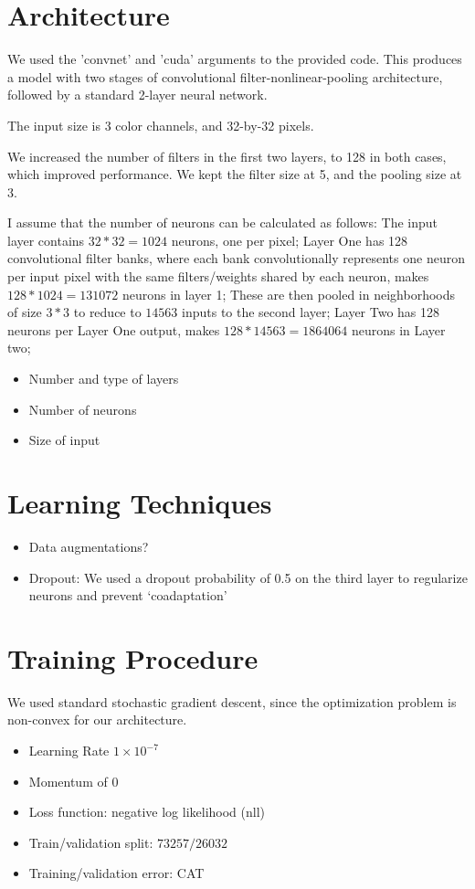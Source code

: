 \documentclass{article}
\begin{document}
\section{Architecture}

We used the 'convnet' and 'cuda' arguments to the provided code. This produces a model with two stages of convolutional filter-nonlinear-pooling architecture, followed by a standard 2-layer neural network.

The input size is 3 color channels, and 32-by-32 pixels.

We increased the number of filters in the first two layers, to 128 in both cases, which improved performance. We kept the filter size at 5, and the pooling size at 3.

I assume that the number of neurons can be calculated as follows: The input layer contains $32*32=1024$ neurons, one per pixel; Layer One has 128 convolutional filter banks, where each bank convolutionally represents one neuron per input pixel with the same filters/weights shared by each neuron, makes $128 * 1024 = 131072$ neurons in layer 1; These are then pooled in neighborhoods of size $3*3$ to reduce to $14563$ inputs to the second layer; Layer Two has 128 neurons per Layer One output, makes $128*14563=1864064$ neurons in Layer two; 

\begin{itemize}
\item Number and type of layers
\item Number of neurons
\item Size of input
\end{itemize}

\section{Learning Techniques}
\begin{itemize}
\item Data augmentations?
\item Dropout: We used a dropout probability of 0.5 on the third layer to
regularize neurons and prevent `coadaptation'
\cite{hinton_improving_2012}
\end{itemize}

\section{Training Procedure}
We used standard stochastic gradient descent, since the optimization problem is
non-convex for our architecture. 
\begin{itemize}
\item Learning Rate $1 \times 10^{-7}$
\item Momentum of $0$
\item Loss function: negative log likelihood (nll)
\item Train/validation split: $73257/26032$
\item Training/validation error: CAT
\end{itemize}



\end{document}
